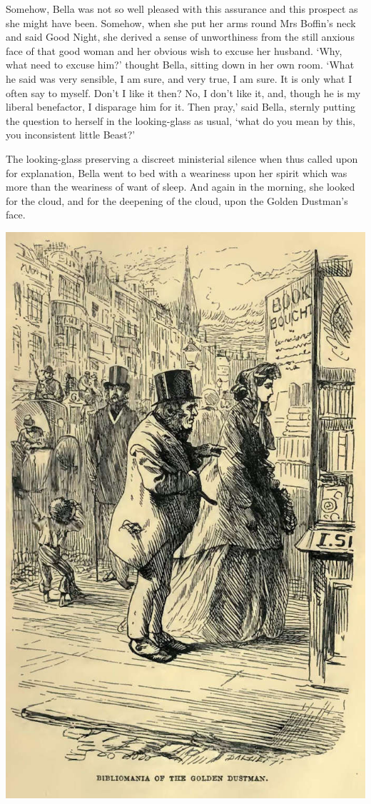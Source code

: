 Somehow, Bella was not so well pleased with this assurance and this
prospect as she might have been. Somehow, when she put her arms
round Mrs Boffin’s neck and said Good Night, she derived a sense of
unworthiness from the still anxious face of that good woman and her
obvious wish to excuse her husband. ‘Why, what need to excuse him?’
thought Bella, sitting down in her own room. ‘What he said was very
sensible, I am sure, and very true, I am sure. It is only what I often
say to myself. Don’t I like it then? No, I don’t like it, and, though
he is my liberal benefactor, I disparage him for it. Then pray,’ said
Bella, sternly putting the question to herself in the looking-glass as
usual, ‘what do you mean by this, you inconsistent little Beast?’

The looking-glass preserving a discreet ministerial silence when thus
called upon for explanation, Bella went to bed with a weariness upon her
spirit which was more than the weariness of want of sleep. And again
in the morning, she looked for the cloud, and for the deepening of the
cloud, upon the Golden Dustman’s face.

\includegraphics[scale=2.3]{03-05-01}

